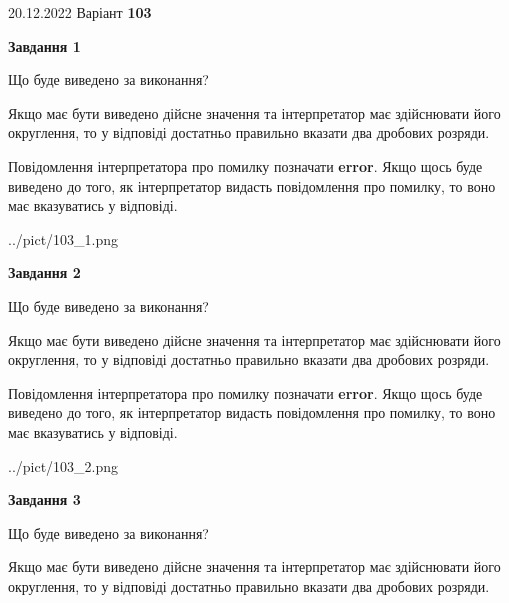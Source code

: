 \documentclass[12pt, ukrainian]{article}
\begin{document}
{20.12.2022 Варіант \No \textbf { 103 }\par}
{
\begin {Large}

{\begin {center}\textbf{Завдання 1}\end {center}}\par
Що буде виведено за виконання? \par

Якщо має бути виведено дійсне значення та інтерпретатор має здійснювати його округлення, 
то у відповіді достатньо правильно вказати два дробових розряди.

Повідомлення інтерпретатора про помилку позначати \textbf{error}.
Якщо щось буде виведено до того, як інтерпретатор видасть повідомлення про помилку, 
то воно має вказуватись у відповіді. \par

\begin{center}
	{../pict/103_1.png}
\end{center}
\newpage

{\begin {center}\textbf{Завдання 2}\end {center}}\par
Що буде виведено за виконання? \par

Якщо має бути виведено дійсне значення та інтерпретатор має здійснювати його округлення, 
то у відповіді достатньо правильно вказати два дробових розряди.

Повідомлення інтерпретатора про помилку позначати \textbf{error}.
Якщо щось буде виведено до того, як інтерпретатор видасть повідомлення про помилку, 
то воно має вказуватись у відповіді. \par

\begin{center}
	{../pict/103_2.png}
\end{center}
\newpage

{\begin {center}\textbf{Завдання 3}\end {center}}\par
Що буде виведено за виконання? \par

Якщо має бути виведено дійсне значення та інтерпретатор має здійснювати його округлення, 
то у відповіді достатньо правильно вказати два дробових розряди.


\end{Large}}
\end{document}
